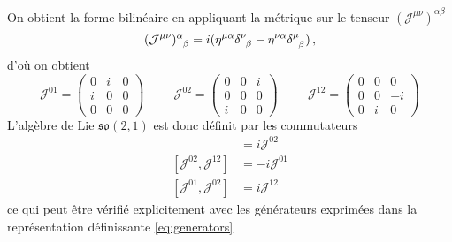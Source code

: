 \documentclass{article}
\numberwithin{equation}{section}
\theoremstyle{solution}
\begin{document}
On obtient la forme bilinéaire en appliquant la métrique sur le tenseur $(\mathcal{J}^{\mu\nu})^{\alpha \beta}$
\begin{equation}
        (\mathcal{J}^{\mu \nu})\indices{^{\alpha}_{\beta}} = i( \eta^{\mu \alpha} \delta\indices{^{\nu}_{\beta}} - \eta^{\nu \alpha} \delta\indices{^{\mu}_{\beta}})\, ,
\end{equation} 
d'où on obtient
\begin{equation}\label{eq:generators}
        \mathcal{J}^{01} = 
        \begin{pmatrix}
                0 & i & 0 \\
                i & 0 & 0 \\
                0 & 0 & 0
        \end{pmatrix}
        \hspace{1cm}
        \mathcal{J}^{02} = 
        \begin{pmatrix}
                0 & 0 & i \\
                0 & 0 & 0 \\
                i & 0 & 0
        \end{pmatrix}
        \hspace{1cm}
        \mathcal{J}^{12} = 
        \begin{pmatrix}
                0 & 0 & 0 \\
                0 & 0 & -i \\
                0 & i & 0
        \end{pmatrix}
\end{equation} 
L'algèbre de Lie $\mathfrak{so}(2, 1)$ est donc définit par les commutateurs 
\begin{align}
        [\mathcal{J}^{01}, \mathcal{J}^{12}] &= i \mathcal{J}^{02} \\
        [\mathcal{J}^{02}, \mathcal{J}^{12}] &= -i \mathcal{J}^{01}  \\
        [\mathcal{J}^{01}, \mathcal{J}^{02}] &= i \mathcal{J}^{12}
\end{align}
ce qui peut être vérifié explicitement avec les générateurs exprimées dans la représentation définissante \eqref{eq:generators} 
\begingroup
\allowdisplaybreaks
\end{document}
